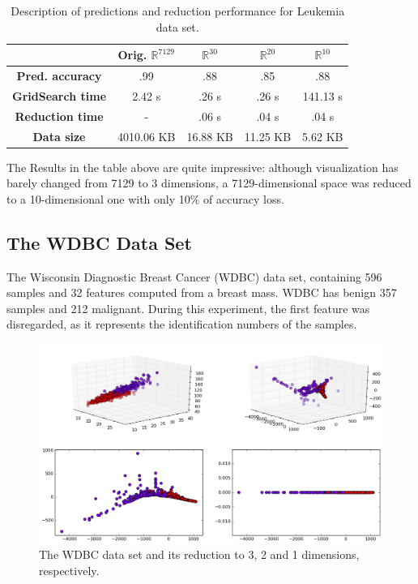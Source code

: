 \documentclass[12pt]{report}
\begin{document}
\begin{table}[H]
	\centering
	\begin{tabular}{|c|c|c|c|c|}
		\hline
		& \textbf{Orig. $\mathbb{R}^{7129}$} & \textbf{$\mathbb{R}^{30}$} & \textbf{$\mathbb{R}^{20}$} & \textbf{$\mathbb{R}^{10}$} \\\hline
		\textbf{Pred. accuracy}    & .99 & .88 & .85 & .88 \\\hline
		\textbf{GridSearch time}   & 2.42 s & .26 s & .26 s & 141.13 s \\\hline
		\textbf{Reduction time}    & - & .06 s & .04 s & .04 s \\\hline
		\textbf{Data size}         & 4010.06 KB & 16.88 KB & 11.25 KB & 5.62 KB \\\hline
	\end{tabular}
	\captionsetup{justification=centering}
	\caption{Description of predictions and reduction performance for Leukemia data set.}
\end{table}

The Results in the table above are quite impressive: although visualization has barely changed from 7129 to 3 dimensions, a 7129-dimensional space was reduced to a 10-dimensional one with only 10\% of accuracy loss.

\subsection{The WDBC Data Set}

The Wisconsin Diagnostic Breast Cancer (WDBC) data set, containing 596 samples and 32 features computed from a breast mass. WDBC has benign 357 samples and 212 malignant. During this experiment, the first feature was disregarded, as it represents the identification numbers of the samples.

\begin{figure}[H]
	\centering
	\includegraphics[width=.9\linewidth]{img/experiments/iso_wdbc}
	\captionsetup{justification=centering}
	\caption{The WDBC data set and its reduction to 3, 2 and 1 dimensions, respectively.}
	\label{fig:iso_wdbc}
\end{figure}
\end{document}
